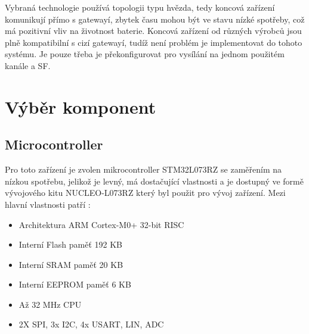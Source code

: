 Vybraná technologie používá topologii typu hvězda, tedy koncová zařízení komunikují přímo s gatewayí, 
zbytek času mohou být ve stavu nízké spotřeby, což má pozitivní vliv na životnost baterie.
Koncová zařízení od různých výrobců jsou plně kompatibilní s cizí gatewayí, tudíž není problém je implementovat do tohoto systému. 
Je pouze třeba je překonfigurovat pro vysílání na jednom použitém kanále a SF.





\section{Výběr komponent}
\subsection{Microcontroller}
Pro toto zařízení je zvolen mikrocontroller STM32L073RZ se zaměřením na nízkou spotřebu, jelikož je levný, má dostačující vlastnosti a je dostupný ve formě vývojového kitu NUCLEO-L073RZ který byl použit pro  vývoj zařízení. Mezi hlavní vlastnosti patří \cite{nucleoST}:
\begin{itemize}    
    \item {Architektura ARM Cortex-M0+ 32-bit RISC}
    \item{Interní Flash paměť 192 KB}
    \item{Interní SRAM paměť 20 KB}
    \item{Interní EEPROM paměť 6 KB}
    \item {Až 32 MHz CPU}
    \item {2X SPI, 3x I2C, 4x USART, LIN, ADC}
\end{itemize}

